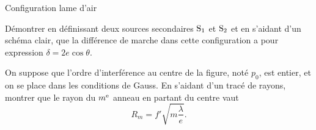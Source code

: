 \begin{exo}[PC][1][TD]{Configuration lame d'air}
\begin{quest}
{    }
\item Démontrer en définissant deux sources secondaires $\rm S_1$ et $\rm S_2$ et en s'aidant d'un schéma clair, que la différence de marche dans cette configuration a pour expression $\delta = 2e \cos \theta$.
\item On suppose que l'ordre d'interférence au centre de la figure, noté $p_0$, est entier, et on se place dans les conditions de Gauss. En s'aidant d'un tracé de rayons, montrer  que le rayon du $m^{\rm e}$ anneau en partant du centre vaut
\begin{equation}\label{eq:rayon_anneau}
  R_m = f' \sqrt{m\frac{\lambda}{e}}.
 \end{equation}

\end{quest}
\end{exo}
